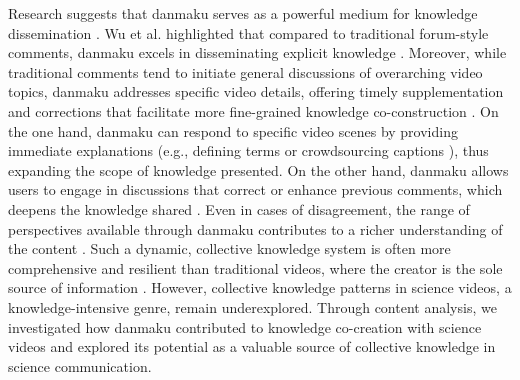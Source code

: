 Research suggests that danmaku serves as a powerful medium for knowledge dissemination \cite{ma2014analysis}. 
Wu et al. highlighted that compared to traditional forum-style comments, danmaku excels in disseminating explicit knowledge \cite{wu2018danmaku, wu2019danmaku}.
Moreover, while traditional comments tend to initiate general discussions of overarching video topics, danmaku addresses specific video details, offering timely supplementation and corrections that facilitate more fine-grained knowledge co-construction \cite{he2021beyond, wu2018danmaku, chen2017watching}.
On the one hand, danmaku can respond to specific video scenes by providing immediate explanations (e.g., defining terms \cite{li2015can} or crowdsourcing captions \cite{ma2014analysis}), thus expanding the scope of knowledge presented. On the other hand, danmaku allows users to engage in discussions that correct or enhance previous comments, which deepens the knowledge shared \cite{he2021beyond}. Even in cases of disagreement, the range of perspectives available through danmaku contributes to a richer understanding of the content \cite{wu2018danmaku, wu2019danmaku}. Such a dynamic, collective knowledge system is often more comprehensive and resilient than traditional videos, where the creator is the sole source of information \cite{yao2017understanding}.
However, collective knowledge patterns in science videos, a knowledge-intensive genre, remain underexplored.
Through content analysis, we investigated how danmaku contributed to knowledge co-creation with science videos and explored its potential as a valuable source of collective knowledge in science communication.

